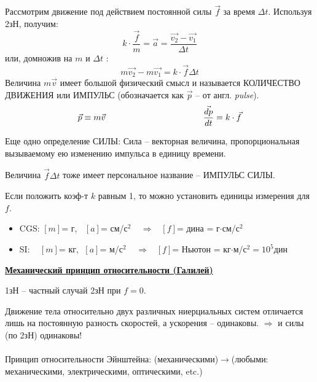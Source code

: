 Рассмотрим движение под действием постоянной силы $\vec{f}$ за время $\Delta t$. Используя 2зН, получим:
\begin{displaymath}
  k\cdot\frac{\vec{f}}{m}=\vec{a}=\frac{\vec{v_2}-\vec{v_1}}{\Delta t}
\end{displaymath}
или, домножив на $m$ и $\Delta t$ :
\begin{displaymath}
 m\vec{v_2}-m\vec{v_1} = k\cdot\vec{f}  \Delta t
\end{displaymath}
Величина $m\vec{v}$ имеет большой физический смысл и называется КОЛИЧЕСТ\-ВО ДВИЖЕНИЯ или ИМПУЛЬС (обозначается как $\vec{p}$ -- от англ. {\sl pulse}).
\begin{displaymath}
\vec{p}\equiv m\vec{v}\hspace{40mm} \frac{\vec{dp}}{dt} = k\cdot\vec{f}
\end{displaymath}

Еще одно определение СИЛЫ: Сила -- векторная величина, пропорцио\-нальная вызываемому ею изменению импульса в единицу времени.

Величина $\vec{f}\Delta t$ тоже имеет персональное название -- ИМПУЛЬС СИЛЫ.

Если положить коэф-т $k$ равным 1, то можно установить единицы измерения для $f$.
\begin{itemize}
\item CGS: $[m]$= г, $\;\;[a]$= см/с$^2\;\;\;\;\Rightarrow\;\;\;[f]$= дина = г$\cdot$см/с$^2$
\item SI: $\;\;\;[m]$= кг, $\;[a]$= м/с$^2\;\;\;\;\Rightarrow\;\;\;[f]$= Ньютон = кг$\cdot$м/с$^2 = 10^5$дин
\end{itemize}
\vspace{2mm}

\underline{\bf Механический принцип относительности (Галилей)}

1зН -- частный случай 2зН при $f=0$.

Движение тела относительно двух различных ниерциальных систем отличается лишь на постоянную разность скоростей, а ускорения -- одина\-ковы. $\Rightarrow$ и силы (по 2зН) одинаковы!\\[3mm]
\\[1mm]

Принцип относительности Эйнштейна: ({\color{blue}механическими})$\rightarrow$({\color{red}любыми: меха\-ническими, электрическими, оптическими, etc.})

